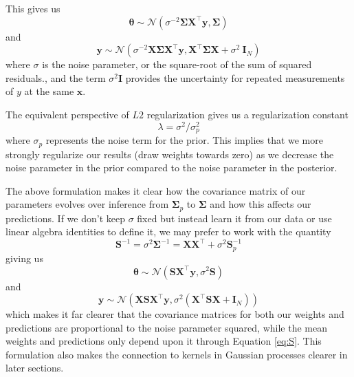 \documentclass{article}
\begin{document}
This gives us
\begin{equation}
    \boldsymbol{\theta}\sim\mathcal{N}( \sigma^{-2}\boldsymbol{\Sigma} \mathbf{X}^\top \mathbf{y},\boldsymbol{\Sigma})
\end{equation} 
and
\begin{equation}
    \mathbf{y}\sim\mathcal{N}\left(\sigma^{-2}\mathbf{X}  \boldsymbol{\Sigma} \mathbf{X}^\top \mathbf{y} ,\mathbf{X}^\top \boldsymbol{\Sigma} \mathbf{X} +\sigma^2\ \mathbf{I}_N\right)
\end{equation} 
where $\sigma$ is the noise parameter, or the square-root of the sum of squared residuals., and the term $\sigma^2 \mathbf{I}$ provides the uncertainty for repeated measurements of $y$ at the same $\mathbf{x}$.

The equivalent perspective of $L2$ regularization gives us a regularization constant \begin{equation}\label{eq:lambda}\lambda=\sigma^2/\sigma_p^2\end{equation} where $\sigma_p$ represents the noise term for the prior. This implies that we more strongly regularize our results (draw weights towards zero) as we decrease the noise parameter in the prior compared to the noise parameter in the posterior. 

The above formulation makes it clear how the covariance matrix of our parameters evolves over inference from $\boldsymbol{\Sigma}_p$ to $\boldsymbol{\Sigma}$ and how this affects our predictions. If we don't keep $\sigma$ fixed but instead learn it from our data or use linear algebra identities to define it, we may prefer to work with the quantity 
\begin{equation}
\label{eq:S}
    \mathbf{S}^{-1} = \sigma^2\boldsymbol{\Sigma}^{-1}=\mathbf{XX}^\top + \sigma^2\mathbf{S}_p^{-1}
\end{equation}
giving us
\begin{equation}
    \boldsymbol{\theta}\sim\mathcal{N}( \mathbf{S} \mathbf{X}^\top \mathbf{y},\sigma^2\mathbf{S})
\end{equation} 
and
\begin{equation}
    \mathbf{y}\sim\mathcal{N}\left(\mathbf{X}  \mathbf{S} \mathbf{X}^\top \mathbf{y} ,\sigma^2\left(\mathbf{X}^\top \mathbf{S}\mathbf{X} + \mathbf{I}_N\right)\right)
\end{equation}
which makes it far clearer that the covariance matrices for both our weights and predictions are proportional to the noise parameter squared, while the mean weights and predictions only depend upon it through Equation \ref{eq:S}. This formulation also makes the connection to kernels in Gaussian processes clearer in later sections.
\end{document}
